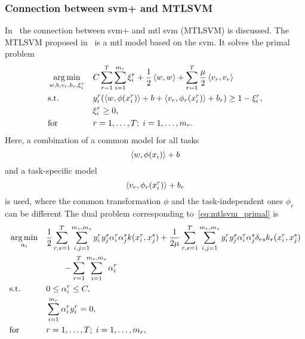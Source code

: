 \subsubsection*{Connection between \acrshort{svm}+ and MTLSVM}
In~\cite{LiangC08} the connection between \acrshort{svm}+ and \acrshort{mtl} \acrshort{svm} (MTLSVM) is discussed. 
The MTLSVM proposed in~\cite{LiangC08} is a \acrshort{mtl} model based on the \acrshort{svm}. It solves the primal problem
\begin{equation}
    \label{eq:mtlsvm_primal}
    \begin{aligned}
        & \argmin_{w, b, v_r, b_r, \xi_i^r}
        & & C \sum_{r=1}^\ntasks \sum_{i=1}^{\npertask_r} \xi_i^r + \frac{1}{2} \dotp{w}{w} + \sum_{r=1}^\ntasks \frac{\mu}{2} \dotp{v_r}{v_r} \\
        & \text{s.t.}
        & & y_{i}^r ( \dotp{w}{\phi(x_{i}^r)} + b + \dotp{v_r}{\phi_r(x_{i}^r)} + b_r) \geq 1 - \xi_i^r ,\\
        & & &\xi_i^r \geq 0, \\
        & \text{for } & & r=1, \ldots, \ntasks; \; i=1, \ldots, \npertask_r.
    \end{aligned}
\end{equation}
Here, a combination of a common model for all tasks
$$ \left\langle w, \phi(x_{i}) \right\rangle + b $$
and a task-specific model
$$ \left\langle v_r, \phi_r(x_{i}^r) \right\rangle + b_r $$
is used, where the common transformation $\phi$ and the task-independent ones $\phi_r$ can be different 
The dual problem corresponding to~\eqref{eq:mtlsvm_primal} is
\begin{equation}\label{eq:mtlsvm_dual}
    \begin{aligned}
        & \argmin_{\alpha_i} 
        & & \frac{1}{2} \sum_{r, s=1}^\ntasks \sum_{i, j=1}^{\npertask_r, \npertask_s} y_i^r y_j^s \alpha_i^r \alpha_j^s k(x_i^r, x_j^s) + \frac{1}{2 \mu} \sum_{r, s=1}^\ntasks  \sum_{i, j=1}^{\npertask_r, \npertask_s} y_i^r y_j^s \alpha_i^r \alpha_j^s \delta_{rs} k_r(x^r_i, x^s_j) \\
        & & & \qquad - \sum_{r=1}^\ntasks \sum_{i=1}^{\npertask_r, \npertask_s} \alpha_i^r \\
        & \text{s.t.}
        & & 0 \leq \alpha_i^r \leq C ,\\
        & & & \sum_{i=1}^{\npertask_r}{\alpha_i^r y_i^r} = 0, \\
        & \text{for } & & r=1, \ldots, \ntasks; \; i=1, \ldots, \npertask_r ,
        \end{aligned}
\end{equation}
